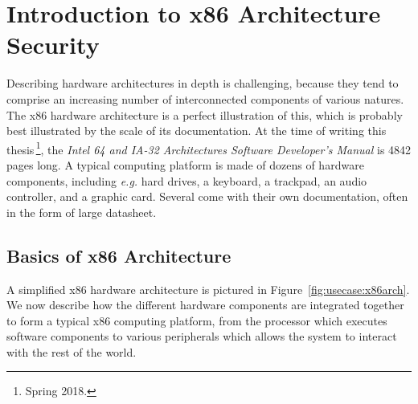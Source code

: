 \section{Introduction to x86 Architecture Security}
\label{sec:usecase:architecture}

Describing hardware architectures in depth is challenging, because they tend to
comprise an increasing number of interconnected components of various natures.
%
The x86 hardware architecture is a perfect illustration of this, which is
probably best illustrated by the scale of its documentation.
%
At the time of writing this thesis\,\footnote{Spring 2018.}, the \emph{Intel 64
  and IA-32 Architectures Software Developer’s Manual} is 4842 pages long.
%
A typical computing platform is made of dozens of hardware components, including
\emph{e.g.} hard drives, a keyboard, a trackpad, an audio controller, and a
graphic card.
%
Several come with their own documentation, often in the form of large datasheet.


\subsection{Basics of x86 Architecture}

A simplified x86 hardware architecture is pictured in
Figure~\ref{fig:usecase:x86arch}.
%
%
We now describe how the different hardware components are integrated together to
form a typical x86 computing platform, from the processor which executes
software components to various peripherals which allows the system to interact
with the rest of the world.

